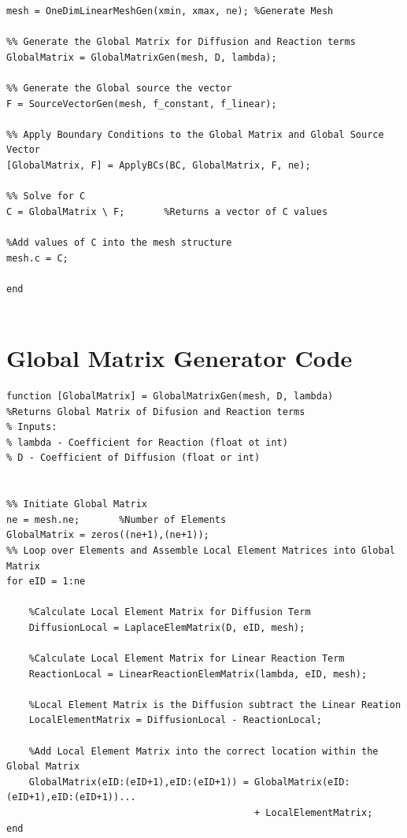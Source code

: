 \documentclass[11pt]{article}
\begin{document}
\begin{appendices}
\begin{lstlisting}
mesh = OneDimLinearMeshGen(xmin, xmax, ne); %Generate Mesh

%% Generate the Global Matrix for Diffusion and Reaction terms
GlobalMatrix = GlobalMatrixGen(mesh, D, lambda);

%% Generate the Global source the vector
F = SourceVectorGen(mesh, f_constant, f_linear);

%% Apply Boundary Conditions to the Global Matrix and Global Source Vector
[GlobalMatrix, F] = ApplyBCs(BC, GlobalMatrix, F, ne);

%% Solve for C
C = GlobalMatrix \ F;       %Returns a vector of C values

%Add values of C into the mesh structure
mesh.c = C;

end


\end{lstlisting}
\pagebreak

\section{Global Matrix Generator Code}
\label{ap:GM}
\begin{lstlisting}
function [GlobalMatrix] = GlobalMatrixGen(mesh, D, lambda)
%Returns Global Matrix of Difusion and Reaction terms
% Inputs:
% lambda - Coefficient for Reaction (float ot int)
% D - Coefficient of Diffusion (float or int)


%% Initiate Global Matrix
ne = mesh.ne;       %Number of Elements
GlobalMatrix = zeros((ne+1),(ne+1));  
%% Loop over Elements and Assemble Local Element Matrices into Global Matrix
for eID = 1:ne
    
    %Calculate Local Element Matrix for Diffusion Term
    DiffusionLocal = LaplaceElemMatrix(D, eID, mesh);

    %Calculate Local Element Matrix for Linear Reaction Term
    ReactionLocal = LinearReactionElemMatrix(lambda, eID, mesh);
    
    %Local Element Matrix is the Diffusion subtract the Linear Reation
    LocalElementMatrix = DiffusionLocal - ReactionLocal;
                        
    %Add Local Element Matrix into the correct location within the Global Matrix
    GlobalMatrix(eID:(eID+1),eID:(eID+1)) = GlobalMatrix(eID:(eID+1),eID:(eID+1))...
                                            + LocalElementMatrix;
end
\end{lstlisting}
\pagebreak


\end{appendices}
\end{document}
